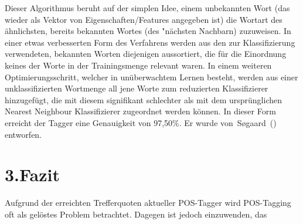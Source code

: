 \documentclass{article}
\begin{document}
\noindent{}Dieser Algorithmus beruht auf der simplen Idee, einem unbekannten Wort (das wieder als Vektor von Eigenschaften/Features angegeben ist) die Wortart des ähnlichsten, bereits bekannten Wortes (des "nächsten Nachbarn) zuzuweisen. In einer etwas verbesserten Form des Verfahrens werden aus den zur Klassifizierung verwendeten, bekannten Worten diejenigen aussortiert, die für die Einordnung keines der Worte in der Trainingsmenge relevant waren. In einem weiteren Optimierungsschritt, welcher in unüberwachtem Lernen besteht, werden aus einer unklassifizierten Wortmenge all jene Worte zum reduzierten Klassifizierer hinzugefügt, die mit diesem signifikant schlechter als mit dem ursprünglichen Nearest Neighbour Klassifizierer zugeordnet werden können.
In dieser Form erreicht der Tagger eine Genauigkeit von 97,50\%. Er wurde von~Søgaard~() entworfen.%

\section{3.\hspace*{0.5em}Fazit}\label{sec-fazit}%

\noindent{}Aufgrund der erreichten Trefferquoten aktueller POS-Tagger wird POS-Tagging oft als gelöstes Problem betrachtet. Dagegen ist jedoch einzuwenden, das%
\end{document}
